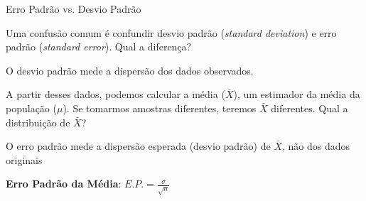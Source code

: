 \documentclass{beamer}\usepackage[]{graphicx}\usepackage[]{color}
\begin{document}
\begin{frame}{Erro Padrão vs. Desvio Padrão}

\begin{small}
  
  \item Uma confusão comum é confundir desvio padrão (\emph{standard deviation}) e erro padrão (\emph{standard error}). Qual a diferença? \pause
  \vfill
  \item O desvio padrão mede a dispersão dos dados observados.
  \vfill
  \item A partir desses dados, podemos calcular a média ($\bar{X}$), um estimador da média da população ($\mu$). Se tomarmos amostras diferentes, teremos $\bar{X}$ diferentes. Qual a distribuição de $\bar{X}$?
  \pause
  \item O erro padrão mede a dispersão esperada (desvio padrão) de $\bar{X}$, não dos dados originais

\end{small}

\vfill

\textbf{Erro Padrão da Média}:
\centering
$ E.P. = \frac{\sigma}{\sqrt{n}}$ 

\end{frame} 
\end{document}
